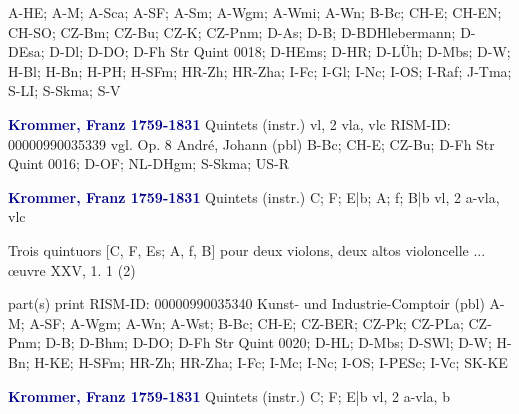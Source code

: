 \documentclass[twocolumn]{book}
\begin{document}
\newline A-HE; A-M; A-Sca; A-SF; A-Sm; A-Wgm; A-Wmi; A-Wn; B-Bc; CH-E; CH-EN; CH-SO; CZ-Bm; CZ-Bu; CZ-K; CZ-Pnm; D-As; D-B; D-BDHlebermann; D-DEsa; D-Dl; D-DO; D-Fh  Str Quint 0018; D-HEms; D-HR; D-LÜh; D-Mbs; D-W; H-Bl; H-Bn; H-PH; H-SFm; HR-Zh; HR-Zha; I-Fc; I-Gl; I-Nc; I-OS; I-Raf; J-Tma; S-LI; S-Skma; S-V
\newline \par \vspace{7pt} \textcolor{darkblue}{\textbf{Krommer, Franz  1759-1831}}
\newline Quintets (instr.)    
 vl, 2 vla, vlc
\newline RISM-ID: 00000990035339
\newline vgl. Op. 8
\newline André, Johann  (pbl)
\newline B-Bc; CH-E; CZ-Bu; D-Fh  Str Quint 0016; D-OF; NL-DHgm; S-Skma; US-R
\newline \par \vspace{7pt} \textcolor{darkblue}{\textbf{Krommer, Franz  1759-1831}}
\newline Quintets (instr.)  C; F; E|b; A; f; B|b  
 vl, 2 a-vla, vlc
\newline \begin{itshape}Trois quintuors [C, F, Es; A, f, B] pour deux violons, deux altos  violoncelle ... œuvre XXV, 1. 1 (2)\end{itshape} 
\newline \textcolor{darkblue}{}  part(s)  
\newline print
\newline RISM-ID: 00000990035340
\newline Kunst- und Industrie-Comptoir  (pbl)
\newline A-M; A-SF; A-Wgm; A-Wn; A-Wst; B-Bc; CH-E; CZ-BER; CZ-Pk; CZ-PLa; CZ-Pnm; D-B; D-Bhm; D-DO; D-Fh  Str Quint 0020; D-HL; D-Mbs; D-SWl; D-W; H-Bn; H-KE; H-SFm; HR-Zh; HR-Zha; I-Fc; I-Mc; I-Nc; I-OS; I-PESc; I-Vc; SK-KE
\newline \par \vspace{7pt} \textcolor{darkblue}{\textbf{Krommer, Franz  1759-1831}}
\newline Quintets (instr.)  C; F; E|b  
 vl, 2 a-vla, b
\end{document}
